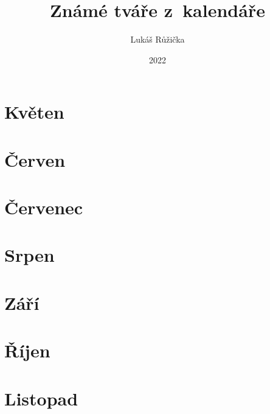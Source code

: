 \documentclass[fontsize=14pt,twoside,a5paper,DIV=calc,BCOR=25mm]{scrbook}
\title{Známé tváře z~kalendáře}
\author{Lukáš Růžička}
\date{2022}
\begin{document}
	\maketitle

	\chapter{Květen}
	
	
	\chapter{Červen}
	
	
	\chapter{Červenec}
	
	
	\chapter{Srpen}
	
	
	\chapter{Září}
	
	
	\chapter{Říjen}
	
	
	\chapter{Listopad}
	
	
	\tableofcontents
\end{document}
